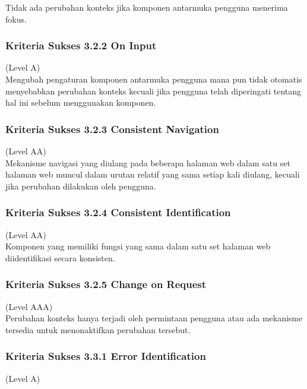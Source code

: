 \documentclass[a4paper,twoside]{article}
\begin{document}
\begin{enumerate}
		Tidak ada perubahan konteks jika komponen antarmuka pengguna menerima fokus.
		
		\subsubsection*{Kriteria Sukses 3.2.2 On Input}
		\label{subsubsec:kriteria_3.2.2}
		(Level A) \\
		
		Mengubah pengaturan komponen antarmuka pengguna mana pun tidak otomatis menyebabkan perubahan konteks kecuali jika pengguna telah diperingati tentang hal ini sebelum menggunakan komponen.
		
		\subsubsection*{Kriteria Sukses 3.2.3 Consistent Navigation}
		\label{subsubsec:kriteria_3.2.3}
		(Level AA) \\
		
		Mekanisme navigasi yang diulang pada beberapa halaman web dalam satu set halaman web muncul dalam urutan relatif yang sama setiap kali diulang, kecuali jika perubahan dilakukan oleh pengguna.
		
		\subsubsection*{Kriteria Sukses 3.2.4 Consistent Identification}
		\label{subsubsec:kriteria_3.2.4}
		(Level AA) \\
		
		Komponen yang memiliki fungsi yang sama dalam satu set halaman web diidentifikasi secara konsisten.
		
		\subsubsection*{Kriteria Sukses 3.2.5 Change on Request}
		\label{subsubsec:kriteria_3.2.5}
		(Level AAA) \\
		
		Perubahan konteks hanya terjadi oleh permintaan pengguna atau ada mekanisme tersedia untuk menonaktifkan perubahan tersebut.
		
		\subsubsection*{Kriteria Sukses 3.3.1 Error Identification}
		\label{subsubsec:kriteria_3.3.1}
		(Level A) \\
		

\end{enumerate}
\end{document}
